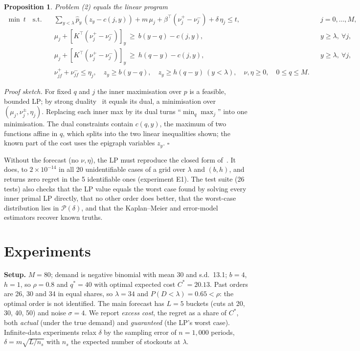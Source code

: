 \documentclass[10pt]{article}
\newtheorem{proposition}{Proposition}
\begin{document}
\begin{proposition}
Problem (2) equals the linear program
\begin{align*}
\min\ t\quad\text{s.t.}\quad
&\textstyle\sum_{y<\lambda}\hat p_y\,(z_y-c(j,y)) + m\,\mu_j+\beta^\top(\nu^+_j-\nu^-_j)+\delta\,\eta_j\le t, && j=0,\dots,M,\\
&\mu_j+[K^\top(\nu^+_j-\nu^-_j)]_y\ \ge\ b(y-q)-c(j,y), && y\ge\lambda,\ \forall j,\\
&\mu_j+[K^\top(\nu^+_j-\nu^-_j)]_y\ \ge\ h(q-y)-c(j,y), && y\ge\lambda,\ \forall j,\\
&\nu^+_{jf}+\nu^-_{jf}\le\eta_j,\quad z_y\ge b(y-q),\quad z_y\ge h(q-y)\ (y<\lambda),\quad \nu,\eta\ge0,\quad 0\le q\le M.
\end{align*}
\end{proposition}
\noindent\emph{Proof sketch.} For fixed $q$ and $j$ the inner maximisation over $p$ is a feasible, bounded LP; by strong duality~\cite{bt} it equals its dual, a minimisation over $(\mu_j,\nu_j^\pm,\eta_j)$. Replacing each inner max by its dual turns ``$\min_q\max_j$'' into one minimisation. The dual constraints contain $c(q,y)$, the maximum of two functions affine in $q$, which splits into the two linear inequalities shown; the known part of the cost uses the epigraph variables $z_y$. $\square$

Without the forecast (no $\nu,\eta$), the LP must reproduce the closed form of~\cite{hs}. It does, to $2\times10^{-14}$ in all 20 unidentifiable cases of a grid over $\lambda$ and $(b,h)$, and returns zero regret in the 5 identifiable ones (experiment E1). The test suite (26 tests) also checks that the LP value equals the worst case found by solving every inner primal LP directly, that no other order does better, that the worst-case distribution lies in $\mathcal{P}(\delta)$, and that the Kaplan--Meier and error-model estimators recover known truths.

\section{Experiments}
\textbf{Setup.} $M=80$; demand is negative binomial with mean 30 and s.d.\ 13.1; $b=4$, $h=1$, so $\rho=0.8$ and $q^*=40$ with optimal expected cost $C^*=20.13$. Past orders are 26, 30 and 34 in equal shares, so $\lambda=34$ and $P(D<\lambda)=0.65<\rho$: the optimal order is not identified. The main forecast has $L=5$ buckets (cuts at 20, 30, 40, 50) and noise $\sigma=4$. We report \emph{excess cost}, the regret as a share of $C^*$, both \emph{actual} (under the true demand) and \emph{guaranteed} (the LP's worst case). Infinite-data experiments relax $\delta$ by the sampling error of $n=1{,}000$ periods, $\delta=m\sqrt{L/n_s}$ with $n_s$ the expected number of stockouts at $\lambda$.
\end{document}
